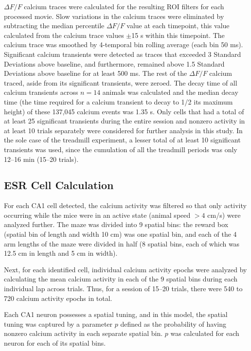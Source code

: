 $\Delta F/F$ calcium traces were calculated for the resulting ROI filters for each processed movie. Slow variations in the calcium traces were eliminated by subtracting the median percentile $\Delta F/F$ value at each timepoint, this value calculated from the calcium trace values $\pm$15 s within this timepoint. The calcium trace was smoothed by 4-temporal bin rolling average (each bin 50 ms). Significant calcium transients were detected as traces that exceeded 3 Standard Deviations above baseline, and furthermore, remained above 1.5 Standard Deviations above baseline for at least 500 ms. The rest of the $\Delta F/F$ calcium traced, aside from its significant transients, were zeroed. The decay time of all calcium transients across $n = 14$ animals was calculated and the median decay time (the time required for a calcium transient to decay to 1/2 its maximum height) of these 137,045 calcium events was 1.35 s. Only cells that had a total of at least 25 significant transients during the entire session and nonzero activity in at least 10 trials separately were considered for further analysis in this study. In the sole case of the treadmill experiment, a lesser total of at least 10 significant transients was used, since the cumulation of all the treadmill periods was only 12--16 min (15--20 trials).

\subsection{ESR Cell Calculation}

For each CA1 cell detected, the calcium activity was filtered so that only activity occurring while the mice were in an active state (animal speed $> 4$ cm/s) were analyzed further. The maze was divided into 9 spatial bins: the reward box (spatial bin of length and width 10 cm) was one spatial bin, and each of the 4 arm lengths of the maze were divided in half (8 spatial bins, each of which was 12.5 cm in length and 5 cm in width).

Next, for each identified cell, individual calcium activity epochs were analyzed by calculating the mean calcium activity in each of the 9 spatial bins during each individual lap across trials. Thus, for a session of 15--20 trials, there were 540 to 720 calcium activity epochs in total.

Each CA1 neuron possesses a spatial tuning, and in this model, the spatial tuning was captured by a parameter $p$ defined as the probability of having nonzero calcium activity in each separate spatial bin. $p$ was calculated for each neuron for each of its spatial bins.

